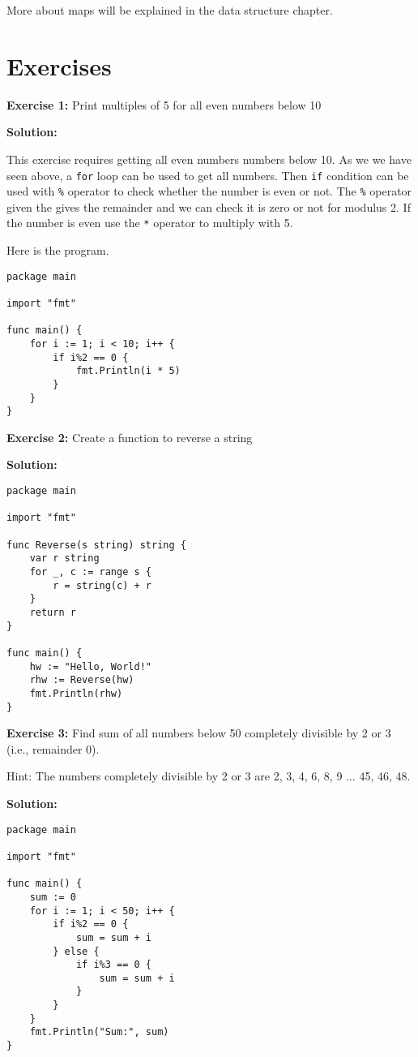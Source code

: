 More about maps will be explained in the data structure chapter.

\section{Exercises}

\textbf{Exercise 1:} Print multiples of 5 for all even numbers below 10

\textbf{Solution:}

This exercise requires getting all even numbers numbers below 10.  As
we we have seen above, a \texttt{for} loop can be used to get all
numbers.  Then \texttt{if} condition can be used with \texttt{\%}
operator to check whether the number is even or not.  The \texttt{\%}
operator given the gives the remainder and we can check it is zero or
not for modulus 2.  If the number is even use the \texttt{*} operator
to multiply with 5.

Here is the program.

\begin{lstlisting}[numbers=none]
package main

import "fmt"

func main() {
    for i := 1; i < 10; i++ {
        if i%2 == 0 {
            fmt.Println(i * 5)
        }
    }
}
\end{lstlisting}

\textbf{Exercise 2:} Create a function to reverse a string

\textbf{Solution:}

\begin{lstlisting}[numbers=none]
package main

import "fmt"

func Reverse(s string) string {
    var r string
    for _, c := range s {
        r = string(c) + r
    }
    return r
}

func main() {
    hw := "Hello, World!"
    rhw := Reverse(hw)
    fmt.Println(rhw)
}
\end{lstlisting}

\textbf{Exercise 3:} Find sum of all numbers below 50 completely divisible
by 2 or 3 (i.e., remainder 0).

Hint: The numbers completely divisible by 2 or 3 are 2, 3, 4, 6, 8, 9 ... 45,
46, 48.

\textbf{Solution:}

\begin{lstlisting}[numbers=none]
package main

import "fmt"

func main() {
    sum := 0
    for i := 1; i < 50; i++ {
        if i%2 == 0 {
            sum = sum + i
        } else {
            if i%3 == 0 {
                sum = sum + i
            }
        }
    }
    fmt.Println("Sum:", sum)
}
\end{lstlisting}

